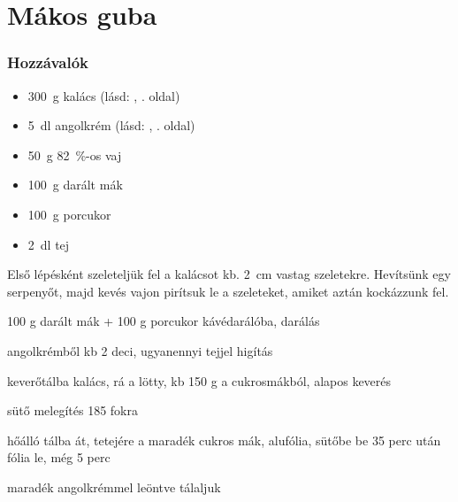 \newpage
\section{Mákos guba} \label{sec:makos_guba}

\subsubsection*{Hozzávalók}
\begin{itemize}
    \item \qty{300}{\g} kalács (lásd: , \pageref{sec:kalacs}. oldal)
    \item \qty{5}{\deci\l} angolkrém (lásd: , \pageref{sec:angolkem}. oldal)
    \item \qty{50}{\g} \qty{82}{\percent}-os vaj
    \item \qty{100}{\g} darált mák
    \item \qty{100}{\g} porcukor
    \item \qty{2}{\deci\l} tej
\end{itemize}

Első lépésként szeleteljük fel a kalácsot kb. \qty{2}{\cm} vastag szeletekre. Hevítsünk egy serpenyőt, majd kevés vajon pirítsuk le a szeleteket, amiket aztán kockázzunk fel.

100 g darált mák + 100 g porcukor kávédarálóba, darálás

angolkrémből kb 2 deci, ugyanennyi tejjel higítás

keverőtálba kalács, rá a lötty, kb 150 g a cukrosmákból, alapos keverés

sütő melegítés 185 fokra

hőálló tálba át, tetejére a maradék cukros mák, alufólia, sütőbe be 35 perc után fólia le, még 5 perc

maradék angolkrémmel leöntve tálaljuk
